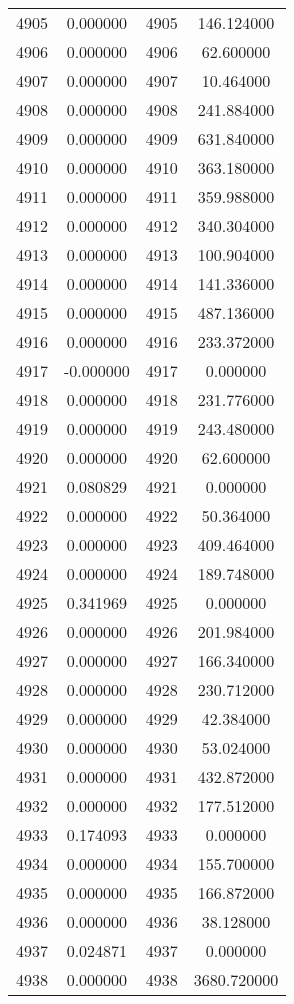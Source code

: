 \documentclass[12pt]{article}
\begin{document}
\begin{longtable}{@{}cccc@{}}
4905 & 0.000000 & 4905 & 146.124000 \\
4906 & 0.000000 & 4906 & 62.600000 \\
4907 & 0.000000 & 4907 & 10.464000 \\
4908 & 0.000000 & 4908 & 241.884000 \\
4909 & 0.000000 & 4909 & 631.840000 \\
4910 & 0.000000 & 4910 & 363.180000 \\
4911 & 0.000000 & 4911 & 359.988000 \\
4912 & 0.000000 & 4912 & 340.304000 \\
4913 & 0.000000 & 4913 & 100.904000 \\
4914 & 0.000000 & 4914 & 141.336000 \\
4915 & 0.000000 & 4915 & 487.136000 \\
4916 & 0.000000 & 4916 & 233.372000 \\
4917 & -0.000000 & 4917 & 0.000000 \\
4918 & 0.000000 & 4918 & 231.776000 \\
4919 & 0.000000 & 4919 & 243.480000 \\
4920 & 0.000000 & 4920 & 62.600000 \\
4921 & 0.080829 & 4921 & 0.000000 \\
4922 & 0.000000 & 4922 & 50.364000 \\
4923 & 0.000000 & 4923 & 409.464000 \\
4924 & 0.000000 & 4924 & 189.748000 \\
4925 & 0.341969 & 4925 & 0.000000 \\
4926 & 0.000000 & 4926 & 201.984000 \\
4927 & 0.000000 & 4927 & 166.340000 \\
4928 & 0.000000 & 4928 & 230.712000 \\
4929 & 0.000000 & 4929 & 42.384000 \\
4930 & 0.000000 & 4930 & 53.024000 \\
4931 & 0.000000 & 4931 & 432.872000 \\
4932 & 0.000000 & 4932 & 177.512000 \\
4933 & 0.174093 & 4933 & 0.000000 \\
4934 & 0.000000 & 4934 & 155.700000 \\
4935 & 0.000000 & 4935 & 166.872000 \\
4936 & 0.000000 & 4936 & 38.128000 \\
4937 & 0.024871 & 4937 & 0.000000 \\
4938 & 0.000000 & 4938 & 3680.720000 \\

\end{longtable}
\end{document}

